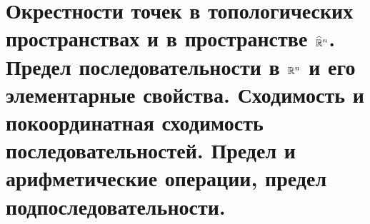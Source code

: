 \documentclass[../main.tex]{subfiles}
\begin{document}
\newpage
\section{Окрестности точек в топологических пространствах и в пространстве \(  \widehat{\mathbb{R}} ^n\). Предел последовательности в \( \mathbb{R} ^n\) и его элементарные свойства. Сходимость и покоординатная сходимость последовательностей. Предел и арифметические операции, предел подпоследовательности.}
\end{document}
